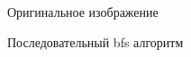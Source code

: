 \documentclass{report}
\begin{document}
\begin{figure}[H]
\caption{Оригинальное изображение}
\end{figure}
\begin{figure}[H]
\caption{Последовательный bfs алгоритм}
\end{figure}
\end{document}
